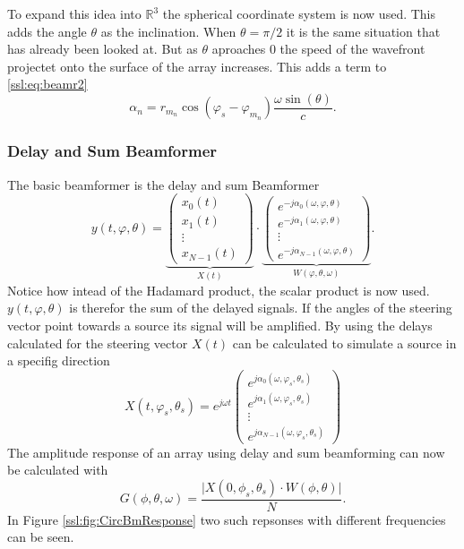 To expand this idea into $\mathbb{R}^3$ the spherical coordinate system is now used.
This adds the angle $\theta$ as the inclination.
When $\theta = \pi/2$ it is the same situation that has already been looked at.
But as $\theta$ aproaches 0 the speed of the wavefront projectet onto the
surface of the array increases. 
This adds a term to \eqref{ssl:eq:beamr2}
\begin{equation}
	\alpha_n = 
	r_{m_n} \cos(\varphi_s - \varphi_{m_n})
	\frac{\omega \sin(\theta)}{c}.
  \label{ssl:eq:beamr3}
\end{equation}

\subsubsection{Delay and Sum Beamformer}
The basic beamformer is the delay and sum Beamformer
\begin{equation}
	\label{ssl:eq:delAndSum}
	y(t, \varphi, \theta) = 
	  \underbrace{
		\begin{pmatrix} 
		  x_0(t) \\ 
		  x_1(t) \\
		  \vdots \\ 
		  x_{N-1}(t)
	  \end{pmatrix}}_{X(t)}
	  \cdot
	  \underbrace{
		\begin{pmatrix} 
			e^{-j\alpha_0(\omega, \varphi, \theta)} \\ 
			e^{-j\alpha_1(\omega, \varphi, \theta)} \\
			\vdots \\ 
			e^{-j\alpha_{N-1}(\omega, \varphi, \theta)} 
		\end{pmatrix}}_{W(\varphi, \theta, \omega)}.
\end{equation}
Notice how intead of the Hadamard product, the scalar product is now used.
$y(t, \varphi, \theta)$ is therefor the sum of the delayed signals.
If the angles of the steering vector point towards a source its 
signal will be amplified.
By using the delays calculated for the steering vector $X(t)$ can
be calculated to simulate a source in a specifig direction
\begin{equation}
	X(t, \varphi_s, \theta_s) = 
	e^{j\omega t}
	\begin{pmatrix} 
		e^{j\alpha_0(\omega, \varphi_s, \theta_s)} \\ 
		e^{j\alpha_1(\omega, \varphi_s, \theta_s)} \\
		\vdots \\ 
		e^{j\alpha_{N-1}(\omega, \varphi_s, \theta_s)} 
	\end{pmatrix}
\end{equation}
The amplitude response of an array using delay and sum beamforming can
now be calculated with
\begin{equation}
	G(\phi, \theta, \omega) = 
	\frac{
		\lvert X(0, \phi_s, \theta_s) \cdot W(\phi, \theta) \rvert}
	{
		N
	}.
\end{equation}
In Figure \ref*{ssl:fig:CircBmResponse} two such repsonses with different 
frequencies can be seen.


